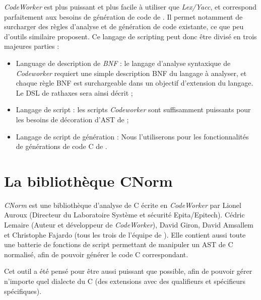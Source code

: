 \documentclass[french]{rtxreport}
\begin{document}
\emph{CodeWorker} est plus puissant et plus facile à utiliser que
\emph{Lex/Yacc}, et correspond parfaitement aux besoins de génération de code
de \rtx. Il permet notamment de surcharger des règles d'analyse et de
génération de code existante, ce que peu d'outils similaire proposent. Ce
langage de scripting peut donc être divisé en trois majeures parties :

\begin{itemize}
    \item Language de description de \emph{BNF} : le langage d'analyse
        syntaxique de \emph{Codeworker} requiert une simple description BNF du
        langage à analyser, et chaque règle BNF est surchargeable dans un
        objectif d'extension du langage. Le DSL de rathaxes sera ainsi décrit ;
    \item Langage de script : les scripts \emph{Codeworker} sont suffisamment
        puissants pour les besoins de décoration d'AST de \rtx ;
    \item Langage de script de génération : Nous l'utiliserons pour les
        fonctionnalités de générations de code C de \rtx.
\end{itemize}



\section{La bibliothèque CNorm}

\emph{CNorm} est une bibliothèque d'analyse de C écrite en \emph{CodeWorker} par
Lionel Auroux (Directeur du Laboratoire Système et sécurité Epita/Epitech).
Cédric Lemaire (Auteur et développeur de \emph{CodeWorker}), David Giron, David
Amsallem et Christophe Fajardo (tous les trois de l'équipe de ). Elle
contient aussi toute une batterie de fonctions de script permettant de manipuler
un AST de C normalisé, afin de pouvoir générer le code C correspondant.

Cet outil a été pensé pour être aussi puissant que possible, afin de pouvoir
gérer n'importe quel dialecte du C (des extensions avec des qualifieurs et
spécifieurs spécifiques).
\end{document}
